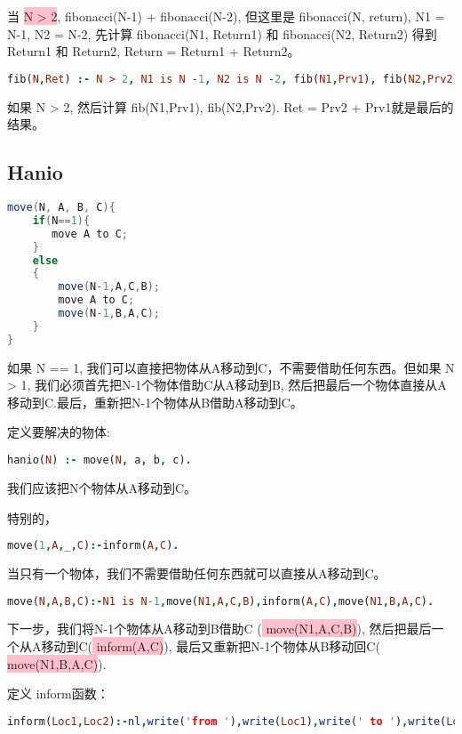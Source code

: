\documentclass[a4paper, 11pt]{article}
\begin{document}
当 \colorbox{pink}{\color{black} N > 2},  fibonacci(N-1) + fibonacci(N-2), 但这里是  fibonacci(N, return), N1 = N-1, N2 = N-2, 先计算  fibonacci(N1, Return1) 和 fibonacci(N2, Return2) 得到 Return1 和 Return2, Return = Return1 + Return2。

\begin{lstlisting}[language={prolog}]
fib(N,Ret) :- N > 2, N1 is N -1, N2 is N -2, fib(N1,Prv1), fib(N2,Prv2), Ret is Prv2 + Prv1.
\end{lstlisting}

如果 N > 2, 然后计算 fib(N1,Prv1), fib(N2,Prv2). Ret = Prv2 + Prv1就是最后的结果。

\subsection{Hanio}
\begin{lstlisting}[language={java}]
move(N, A, B, C){
    if(N==1){
       move A to C;
    }
    else
    {
        move(N-1,A,C,B);
        move A to C;
        move(N-1,B,A,C);
    }
}
\end{lstlisting}

如果 N == 1, 我们可以直接把物体从A移动到C，不需要借助任何东西。但如果 N > 1, 我们必须首先把N-1个物体借助C从A移动到B, 然后把最后一个物体直接从A移动到C.最后，重新把N-1个物体从B借助A移动到C。

定义要解决的物体:
\begin{lstlisting}[language={prolog}]
hanio(N) :- move(N, a, b, c).
\end{lstlisting}

我们应该把N个物体从A移动到C。

特别的，
\begin{lstlisting}[language={prolog}]
move(1,A,_,C):-inform(A,C).
\end{lstlisting}

当只有一个物体，我们不需要借助任何东西就可以直接从A移动到C。

\begin{lstlisting}[language={prolog}]
move(N,A,B,C):-N1 is N-1,move(N1,A,C,B),inform(A,C),move(N1,B,A,C).
\end{lstlisting}

下一步，我们将N-1个物体从A移动到B借助C (\colorbox{pink}{\color{black} move(N1,A,C,B)}), 然后把最后一个从A移动到C(\colorbox{pink}{\color{black} inform(A,C)}), 最后又重新把N-1个物体从B移动回C(\colorbox{pink}{\color{black} move(N1,B,A,C)}).

定义 inform函数：
\begin{lstlisting}[language={prolog}]
inform(Loc1,Loc2):-nl,write('from '),write(Loc1),write(' to '),write(Loc2).
\end{lstlisting}


%
%
\end{document}
